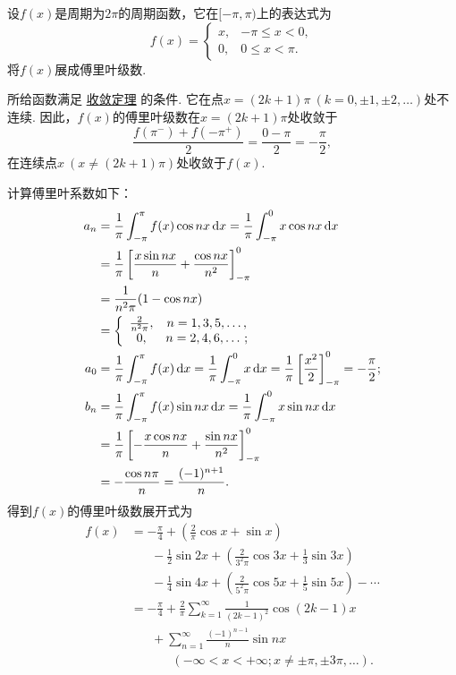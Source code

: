 \begin{example}
设\(f(x)\)是周期为\(2\pi\)的周期函数，它在\([-\pi,\pi)\)上的表达式为\[
f(x) = \left\{ \begin{array}{cc}
x, & -\pi \leqslant x < 0, \\
0, & 0 \leqslant x < \pi.
\end{array} \right.
\]
将\(f(x)\)展成傅里叶级数.
\begin{solution}
所给函数满足 \hyperref[theorem:无穷级数.傅里叶级数收敛的狄利克雷充分条件]{收敛定理} 的条件.
它在点\(x=(2k+1)\pi\ (k=0,\pm1,\pm2,\dotsc)\)处不连续.
因此，\(f(x)\)的傅里叶级数在\(x=(2k+1)\pi\)处收敛于\[
\frac{f(\pi^-)+f(-\pi^+)}{2} = \frac{0-\pi}{2} = -\frac{\pi}{2},
\]在连续点\(x\ (x\neq(2k+1)\pi)\)处收敛于\(f(x)\).

计算傅里叶系数如下：\begin{align*}
a_n &= \frac{1}{\pi} \int_{-\pi}^{\pi} f(x) \cos nx \dd{x}
= \frac{1}{\pi} \int_{-\pi}^0 x \cos nx \dd{x} \\
&= \frac{1}{\pi} \left[ \frac{x \sin nx}{n} + \frac{\cos nx}{n^2} \right]_{-\pi}^0 \\
&= \frac{1}{n^2 \pi} (1-\cos nx) \\
&= \left\{ \begin{array}{cc}
\frac{2}{n^2 \pi}, & n=1,3,5,\dotsc, \\
0, & n=2,4,6,\dotsc;
\end{array} \right. \\
a_0 &= \frac{1}{\pi} \int_{-\pi}^{\pi} f(x) \dd{x}
= \frac{1}{\pi} \int_{-\pi}^0 x \dd{x}
= \frac{1}{\pi} \left[ \frac{x^2}{2} \right]_{-\pi}^0 = -\frac{\pi}{2}; \\
b_n &= \frac{1}{\pi} \int_{-\pi}^{\pi} f(x) \sin nx \dd{x}
= \frac{1}{\pi} \int_{-\pi}^0 x \sin nx \dd{x} \\
&= \frac{1}{\pi} \left[ -\frac{x \cos nx}{n} + \frac{\sin nx}{n^2} \right]_{-\pi}^0 \\
&= -\frac{\cos n\pi}{n} = \frac{(-1)^{n+1}}{n}.
\end{align*}
得到\(f(x)\)的傅里叶级数展开式为\begin{align*}
f(x) &= -\frac{\pi}{4} + \left(\frac{2}{\pi} \cos x + \sin x\right) \\
&\hspace{20pt}-\frac{1}{2}\sin 2x + \left(\frac{2}{3^2\pi}\cos 3x + \frac{1}{3}\sin 3x\right) \\
&\hspace{20pt}-\frac{1}{4}\sin 4x + \left(\frac{2}{5^2\pi}\cos 5x + \frac{1}{5}\sin 5x\right)
-\dotsb \\
&= -\frac{\pi}{4} + \frac{2}{\pi} \sum\limits_{k=1}^{\infty} \frac{1}{(2k-1)^2} \cos(2k-1)x \\
&\hspace{20pt}+\sum\limits_{n=1}^{\infty} \frac{(-1)^{n-1}}{n} \sin nx \\
&\hspace{40pt}(-\infty<x<+\infty; x\neq\pm\pi,\pm3\pi,\dotsc).
\end{align*}
\end{solution}
\end{example}

